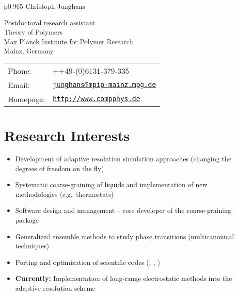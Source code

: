 \documentclass{article}
\begin{document}
\vspace*{-1.2cm}

\begin{tabular}{p{0.965\textwidth}}
{\huge Christoph Junghans}\\
\hline
\end{tabular}
\vspace{0.25in}

\begin{minipage}{0.45\linewidth}
  Postdoctoral research assistant\\
  Theory of Polymers\\
  \href{http://www.mpip-mainz.mpg.de}{Max Planck Institute for Polymer Research} \\
  Mainz, Germany
\end{minipage}
\begin{minipage}{0.45\linewidth}
  \begin{tabular}{ll}
    Phone: & ++49-(0)6131-379-335 \\
    Email: & \href{mailto:junghans@mpip-mainz.mpg.de}{\tt junghans@mpip-mainz.mpg.de} \\
    Homepage: & \href{http://www.compphys.de}{\tt http://www.compphys.de} \\
  \end{tabular}
\end{minipage}

\section*{Research Interests}
\begin{itemize}
\setlength{\itemsep}{0pt}
\setlength{\parskip}{0pt}
\setlength{\parsep}{0pt}
\item Development of adaptive resolution simulation approaches (changing the degrees of freedom on the fly)
\item Systematic coarse-graining of liquids and implementation of new methodologies (e.g.\ thermostats)
\item Software design and management -- core developer of the coarse-graining package 
\item Generalized ensemble methods to study phase transitions (multicanonical techniques)
\item Porting and optimization of scientific codes (, , )
\item \textbf{Currently:} Implementation of long-range electrostatic methods into the adaptive resolution scheme
\end{itemize}
\end{document}
